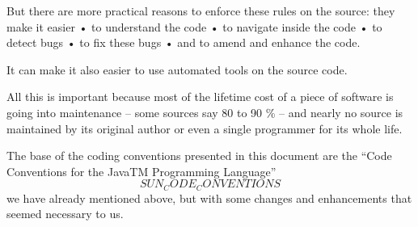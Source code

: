 \documentclass[12pt,a4paper,titlepage,parskip=half]{scrbook}
\begin{document}
But there are more practical reasons to enforce these rules on the source: they make it easier
    • to understand the code
    • to navigate inside the code
    • to detect bugs
    • to fix these bugs
    • and to amend and enhance the code.

It can make it also easier to use automated tools on the source code.

All this is important because most of the lifetime cost of a piece of software is going into maintenance – some sources say 80 to 90 \% – and nearly no source is maintained by its original author or even a single programmer for its whole life.

The base of the coding conventions presented in this document are the “Code Conventions for the JavaTM Programming Language” \[SUN_CODE_CONVENTIONS\] we have already mentioned above, but with some changes and enhancements that seemed necessary to us.
\end{document}
